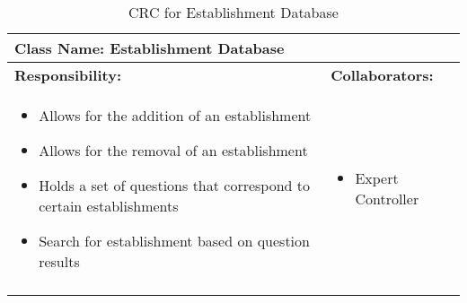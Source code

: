 \documentclass[titlepage]{article}
\begin{document}
\newpage
	\begin{longtable}{| p{} | p{} |}
			\hline
			 \multicolumn{2}{|l|}{\textbf{Class Name: Establishment Database}} \\
			\hline
			\textbf{Responsibility:} & \textbf{Collaborators:} \\
			\hline
				\begin{itemize}
					\item Allows for the addition of an establishment
					\item Allows for the removal of an establishment
					\item Holds a set of questions that correspond to certain establishments
					\item Search for establishment based on question results
				\end{itemize} & 
				\begin{itemize}
					\item Expert Controller
				\end{itemize} 
				\\
			\hline
		\caption{CRC for Establishment Database}
	\end{longtable}
	
	
	
\newpage

\appendix
\end{document}
